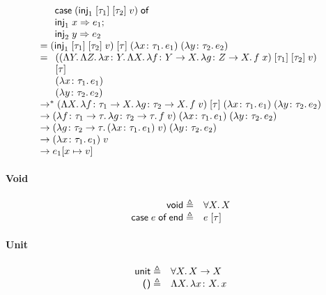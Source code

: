 \documentclass{lecturenotes}
\newcommand{\tabs}[3]{\ensuremath{\lambda #1 \colon #2.\,#3}}
\newcommand{\app}[2]{\ensuremath{#1\;#2}}
\newcommand{\utype}{\textsf{unit}\xspace}
\newcommand{\unit}{\ensuremath{\textsf{(}\mkern0.5mu\textsf{)}}}
\newcommand{\vtype}{\textsf{void}\xspace}
\newcommand{\vcase}[1]{\ensuremath{\textsf{case}\mkern5mu#1\mkern5mu\textsf{of}\mkern5mu\textsf{end}}}
\newcommand{\fatype}[2]{\ensuremath{\forall #1.\,#2}}
\newcommand{\Abs}[2]{\Lambda #1.\,#2}
\newcommand{\App}[2]{#1\;[#2]}
\begin{document}
$$
\begin{array}{l}
  \hspace{1em}\begin{array}[t]{l}
    \textsf{case}\mkern5mu(\app{\App{\App{\textsf{inj}_1}{\tau_1}}{\tau_2}}{v})\mkern5mu\textsf{of}\\
    \app{\textsf{inj}_1}{x} \Rightarrow e_1;\\
    \app{\textsf{inj}_2}{y} \Rightarrow e_2
  \end{array}\\
  = \app{\app{\App{(\app{\App{\App{\textsf{inj}_1}{\tau_1}}{\tau_2}}{v})}{\tau}}{(\tabs{x}{\tau_1}{e_1})}}{(\tabs{y}{\tau_2}{e_2})}\\
  = \begin{array}[t]{l}(\app{\App{\App{(\Abs{Y}{\Abs{Z}{\tabs{x}{Y}{\Abs{X}{\tabs{f}{Y \to X}{\tabs{g}{Z \to X}{\app{f}{x}}}}}}})}{\tau_1}}{\tau_2}}{v})\\[0em] [\tau] \\(\tabs{x}{\tau_1}{e_1})\\(\tabs{y}{\tau_2}{e_2})\end{array}\\
  \to^\ast \app{\app{\App{(\Abs{X}{\tabs{f}{\tau_1 \to X}{\tabs{g}{\tau_2 \to X}{\app{f}{v}}}})}{\tau}}{(\tabs{x}{\tau_1}{e_1})}}{(\tabs{y}{\tau_2}{e_2})}\\
  \to \app{\app{(\tabs{f}{\tau_1 \to \tau}{\tabs{g}{\tau_2 \to \tau}{\app{f}{v}}})}{(\tabs{x}{\tau_1}{e_1})}}{(\tabs{y}{\tau_2}{e_2})}\\
  \to \app{(\tabs{g}{\tau_2 \to \tau}{\app{(\tabs{x}{\tau_1}{e_1})}{v}})}{(\tabs{y}{\tau_2}{e_2})}\\
   \to \app{(\tabs{x}{\tau_1}{e_1})}{v}\\
   \to e_1[x \mapsto v]
\end{array}
$$

\paragraph{Void}
$$
\begin{array}{rl}
  \vtype \triangleq& \fatype{X}{X}\\
  \vcase{e} \triangleq& \App{e}{\tau}
\end{array}
$$

\paragraph{Unit}
$$
\begin{array}{rl}
  \utype \triangleq& \fatype{X}{X \to X}\\
  \unit \triangleq& \Abs{X}{\tabs{x}{X}{x}}
\end{array}
$$
\end{document}
